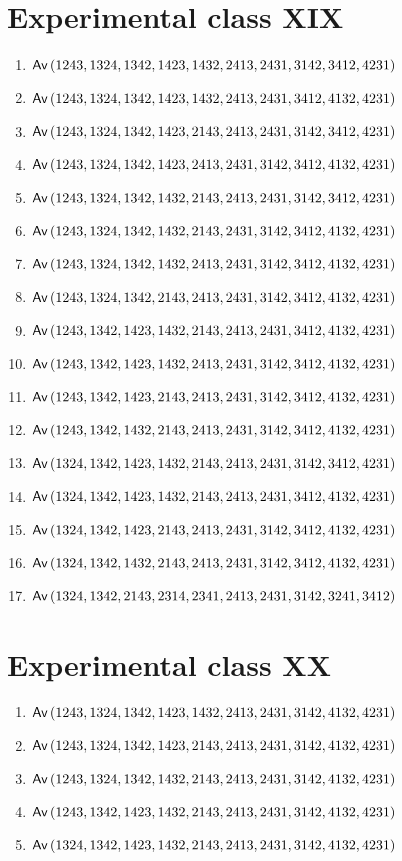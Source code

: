 \section{Experimental class XIX}
\begin{enumerate}
\item $\textsf{Av}\left(1243,1324,1342,1423,1432,2413,2431,3142,3412,4231\right)$
\item $\textsf{Av}\left(1243,1324,1342,1423,1432,2413,2431,3412,4132,4231\right)$
\item $\textsf{Av}\left(1243,1324,1342,1423,2143,2413,2431,3142,3412,4231\right)$
\item $\textsf{Av}\left(1243,1324,1342,1423,2413,2431,3142,3412,4132,4231\right)$
\item $\textsf{Av}\left(1243,1324,1342,1432,2143,2413,2431,3142,3412,4231\right)$
\item $\textsf{Av}\left(1243,1324,1342,1432,2143,2431,3142,3412,4132,4231\right)$
\item $\textsf{Av}\left(1243,1324,1342,1432,2413,2431,3142,3412,4132,4231\right)$
\item $\textsf{Av}\left(1243,1324,1342,2143,2413,2431,3142,3412,4132,4231\right)$
\item $\textsf{Av}\left(1243,1342,1423,1432,2143,2413,2431,3412,4132,4231\right)$
\item $\textsf{Av}\left(1243,1342,1423,1432,2413,2431,3142,3412,4132,4231\right)$
\item $\textsf{Av}\left(1243,1342,1423,2143,2413,2431,3142,3412,4132,4231\right)$
\item $\textsf{Av}\left(1243,1342,1432,2143,2413,2431,3142,3412,4132,4231\right)$
\item $\textsf{Av}\left(1324,1342,1423,1432,2143,2413,2431,3142,3412,4231\right)$
\item $\textsf{Av}\left(1324,1342,1423,1432,2143,2413,2431,3412,4132,4231\right)$
\item $\textsf{Av}\left(1324,1342,1423,2143,2413,2431,3142,3412,4132,4231\right)$
\item $\textsf{Av}\left(1324,1342,1432,2143,2413,2431,3142,3412,4132,4231\right)$
\item $\textsf{Av}\left(1324,1342,2143,2314,2341,2413,2431,3142,3241,3412\right)$
\end{enumerate}

\section{Experimental class XX}
\begin{enumerate}
\item $\textsf{Av}\left(1243,1324,1342,1423,1432,2413,2431,3142,4132,4231\right)$
\item $\textsf{Av}\left(1243,1324,1342,1423,2143,2413,2431,3142,4132,4231\right)$
\item $\textsf{Av}\left(1243,1324,1342,1432,2143,2413,2431,3142,4132,4231\right)$
\item $\textsf{Av}\left(1243,1342,1423,1432,2143,2413,2431,3142,4132,4231\right)$
\item $\textsf{Av}\left(1324,1342,1423,1432,2143,2413,2431,3142,4132,4231\right)$
\end{enumerate}

